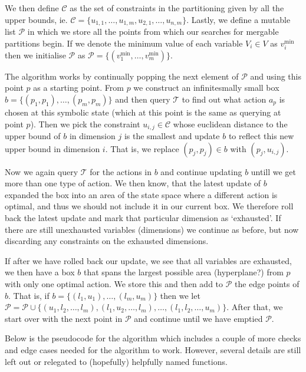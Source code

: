 \documentclass{article}
\begin{document}
We then define $\mathcal{C}$ as the set of constraints in the partitioning given
by all the upper bounds, ie. $\mathcal{C} = \{ u_{1,1}, \ldots, u_{1,m},
u_{2,1}, \ldots, u_{n, m} \}$. Lastly, we define a mutable list $\mathcal{P}$ in
which we store all the points from which our searches for mergable partitions
begin. If we denote the minimum value of each variable $V_i \in V$ as
$v^{\min}_i$ then we initialise $\mathcal{P}$ as $\mathcal{P} = \{ (v^{\min}_1,
\ldots, v^{\min}_m) \}$.

The algorithm works by continually popping the next element of $\mathcal{P}$ and
using this point $p$ as a starting point. From $p$ we construct an
infinitesmally small box $b = \{ (p_1, p_1), \ldots, (p_m,p_m) \}$ and then
query $\mathcal{T}$ to find out what action $a_p$ is chosen at this symbolic
state (which at this point is the same as querying at point $p$). Then we pick
the constraint $u_{i,j} \in \mathcal{C}$ whose euclidean distance to the upper
bound of $b$ in dimension $j$ is the smallest and update $b$ to reflect this new
upper bound in dimension $i$. That is, we replace $(p_j, p_j) \in b$ with $(p_j,
u_{i,j})$.

Now we again query $\mathcal{T}$ for the actions in $b$ and continue updating
$b$ untill we get more than one type of action. We then know, that the latest
update of $b$ expanded the box into an area of the state space where a different
action is optimal, and thus we should not include it in our current box. We
therefore roll back the latest update and mark that particular dimension as
`exhausted'. If there are still unexhausted variables (dimensions) we continue
as before, but now discarding any constraints on the exhausted dimensions.

If after we have rolled back our update, we see that all variables are
exhausted, we then have a box $b$ that spans the largest possible area
(hyperplane?) from $p$ with only one optimal action. We store this and then add
to $\mathcal{P}$ the edge points of $b$. That is, if $b = \{ (l_{1},
u_{1}), \ldots, (l_{m}, u_{m}) \}$ then we let $\mathcal{P} = \mathcal{P} \cup
\{ (u_{1}, l_{2}, \ldots, l_{m}), (l_{1}, u_{2}, \ldots, l_{m}), \ldots, (l_{1},
l_{2}, \ldots, u_{m}) \}$. After that, we start over with the next point in
$\mathcal{P}$ and continue until we have emptied $\mathcal{P}$.

Below is the pseudocode for the algorithm which includes a couple of more checks
and edge cases needed for the algorithm to work. However, several details are
still left out or relegated to (hopefully) helpfully named functions.
\end{document}
